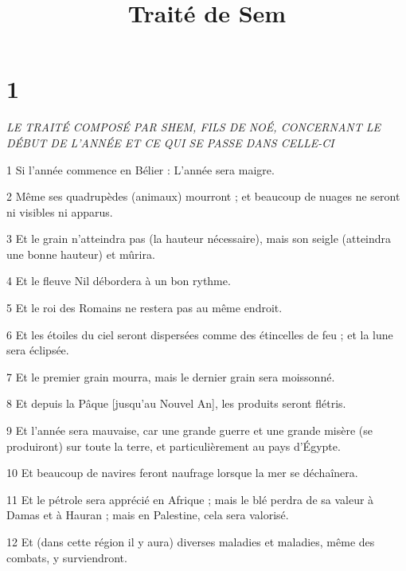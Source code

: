 

\title{Traité de Sem}

\chapter{1}

\par \textit{LE TRAITÉ COMPOSÉ PAR SHEM, FILS DE NOÉ, CONCERNANT LE DÉBUT DE L'ANNÉE ET CE QUI SE PASSE DANS CELLE-CI}


\par 1 Si l'année commence en Bélier : L'année sera maigre.

\par 2 Même ses quadrupèdes (animaux) mourront ; et beaucoup de nuages ​​ne seront ni visibles ni apparus.

\par 3 Et le grain n'atteindra pas (la hauteur nécessaire), mais son seigle (atteindra une bonne hauteur) et mûrira.

\par 4 Et le fleuve Nil débordera à un bon rythme.

\par 5 Et le roi des Romains ne restera pas au même endroit.

\par 6 Et les étoiles du ciel seront dispersées comme des étincelles de feu ; et la lune sera éclipsée.

\par 7 Et le premier grain mourra, mais le dernier grain sera moissonné.

\par 8 Et depuis la Pâque [jusqu'au Nouvel An], les produits seront flétris.

\par 9 Et l'année sera mauvaise, car une grande guerre et une grande misère (se produiront) sur toute la terre, et particulièrement au pays d'Égypte.

\par 10 Et beaucoup de navires feront naufrage lorsque la mer se déchaînera.

\par 11 Et le pétrole sera apprécié en Afrique ; mais le blé perdra de sa valeur à Damas et à Hauran ; mais en Palestine, cela sera valorisé.

\par 12 Et (dans cette région il y aura) diverses maladies et maladies, même des combats, y surviendront.

